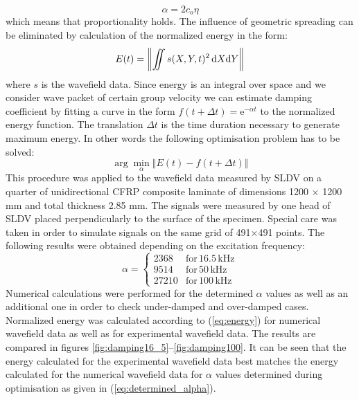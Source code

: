 {\begin{equation}
\alpha = 2 c_o \eta
\label{eq:alpha_prop}
\end{equation}
which means that proportionality holds.
The influence of geometric spreading can be eliminated by calculation of the normalized energy in the form:
\begin{equation}
E(t) = \left\Vert \iint  s(X,Y,t)^2 \, \mathrm{d} X \mathrm{d} Y \right\Vert
\label{eq:energy}
\end{equation}
where \(s\) is the wavefield data. 
Since energy is an integral over space and we consider wave packet of certain group velocity we can estimate damping coefficient by fitting a curve in the form \(f(t+\Delta t) = \mathrm{e}^{-\alpha t}\) to the normalized energy function.
The translation \(\Delta t\) is the time duration necessary to generate maximum energy.
In other words the following optimisation problem has to be solved:
\begin{equation}
\arg \min_{\alpha}   \left\Vert E(t) - f(t+\Delta t) \right\Vert
\end{equation}
This procedure was applied to the wavefield data measured by SLDV on a quarter of unidirectional CFRP composite laminate of dimensions 1200 \(\times\) 1200 mm and total thickness 2.85 mm.
The signals were measured by one head of SLDV placed perpendicularly to the surface of the specimen.
Special care was taken in order to simulate signals on the same grid of 491\(\times\)491 points.
The following results were obtained depending on the excitation frequency:
\begin{equation}
\alpha =  \left \{
\begin{array}{rl}  
2368 & \mathrm{for\, 16.5\, kHz} \\[2pt]
9514 &\mathrm{for\, 50\, kHz}  \\[2pt]
27210 &\mathrm{for\, 100\, kHz} 
\end{array} \right.
\label{eq:determined_alpha}
\end{equation}
Numerical calculations were performed for the determined  \(\alpha\) values as well as an additional one in order to check under-damped and over-damped cases.
Normalized energy was calculated according to (\ref{eq:energy}) for numerical wavefield data as well as for experimental wavefield data.
The results are compared in figures \ref{fig:damping16_5}--\ref{fig:damping100}.
It can be seen that the energy calculated for the experimental wavefield data best matches the energy calculated for the numerical wavefield data for \(\alpha\) values determined during optimisation as given in (\ref{eq:determined_alpha}). 
}
